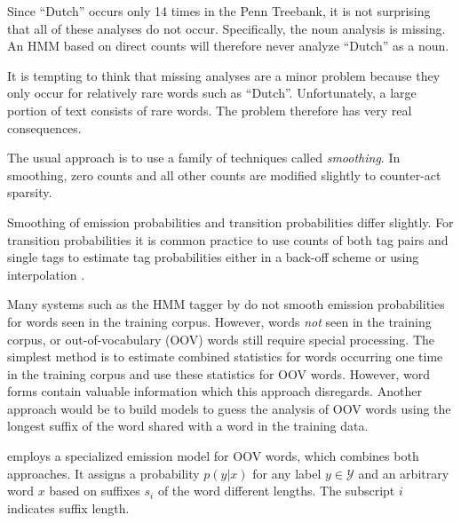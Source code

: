 Since ``Dutch'' occurs only 14 times in the Penn Treebank, it is not
surprising that all of these analyses do not occur. Specifically, the
noun analysis is missing. An HMM based on direct counts will therefore
never analyze ``Dutch'' as a noun.

It is tempting to think that missing analyses are a minor problem
because they only occur for relatively rare words such as
``Dutch''. Unfortunately, a large portion of text consists of rare
words. The problem therefore has very real consequences.

The usual approach is to use a family of techniques called {\it
  smoothing}. In smoothing, zero counts and all other counts are
modified slightly to counter-act sparsity.

Smoothing of emission probabilities and transition probabilities differ
slightly. For transition probabilities it is common practice to use
counts of both tag pairs and single tags to estimate tag probabilities
either in a back-off scheme or using interpolation
\citep{Brants2000}. %

Many systems such as the HMM tagger by \cite{Brants2000} do not smooth
emission probabilities for words seen in the training corpus. However,
words {\it not} seen in the training corpus, or out-of-vocabulary
(OOV) words still require special processing. The simplest method is
to estimate combined statistics for words occurring one time in the
training corpus and use these statistics for OOV words. However, word
forms contain valuable information which this approach
disregards. Another approach would be to build models to guess the
analysis of OOV words using the longest suffix of the word shared with
a word in the training data.

\cite{Brants2000} employs a specialized emission model for OOV words,
which combines both approaches. It assigns a probability $p(y|x)$ for
any label $y \in \mathcal{Y}$ and an arbitrary word $x$ based on
suffixes $s_i$ of the word different lengths. The subscript $i$
indicates suffix length.

